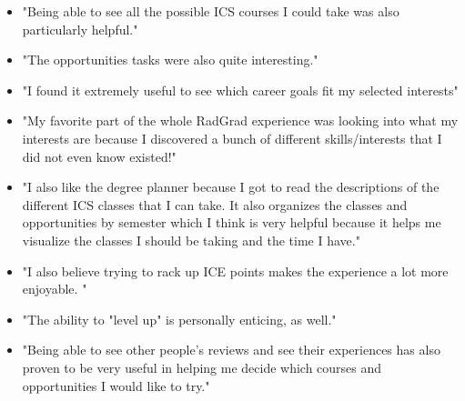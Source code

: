 \documentclass[acmsmall]{acmart}
\begin{document}
\begin{itemize}
\item "Being able to see all the possible ICS courses I could take was also particularly helpful."
\end{itemize}

\begin{itemize}
\item "The opportunities tasks were also quite interesting."
\end{itemize}

\begin{itemize}
\item "I found it extremely useful to see which career goals fit my selected interests"
\end{itemize}

\begin{itemize}
\item "My favorite part of the whole RadGrad experience was looking into what my interests are because I discovered a bunch of different skills/interests that I did not even know existed!"
\end{itemize}

\begin{itemize}
\item "I also like the degree planner because I got to read the descriptions of the different ICS classes that I can take. It also organizes the classes and opportunities by semester which I think is very helpful because it helps me visualize the classes I should be taking and the time I have."
\end{itemize}

\begin{itemize}
\item "I also believe trying to rack up ICE points makes the experience a lot more enjoyable. "
\item "The ability to "level up" is personally enticing, as well."
\end{itemize}

\begin{itemize}
\item "Being able to see other people’s reviews and see their experiences has also proven to be very useful in helping me decide which courses and opportunities I would like to try."
\end{itemize}
\end{document}
